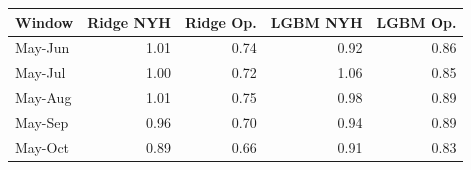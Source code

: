 \begin{tabular}{lrrrr}
\toprule
Window & Ridge NYH & Ridge Op. & LGBM NYH & LGBM Op. \\
\midrule
May-Jun & 1.01 & 0.74 & 0.92 & 0.86 \\
May-Jul & 1.00 & 0.72 & 1.06 & 0.85 \\
May-Aug & 1.01 & 0.75 & 0.98 & 0.89 \\
May-Sep & 0.96 & 0.70 & 0.94 & 0.89 \\
May-Oct & 0.89 & 0.66 & 0.91 & 0.83 \\
\bottomrule
\end{tabular}
